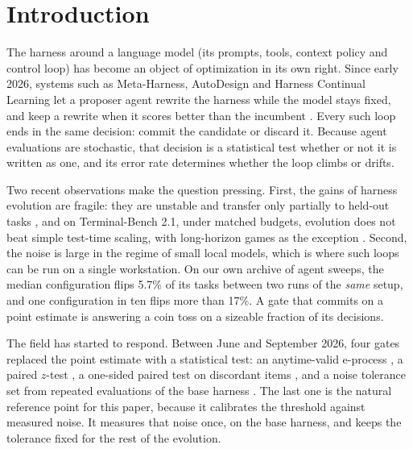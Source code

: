 
\section{Introduction}\label{sec:intro}

The harness around a language model (its prompts, tools, context policy and
control loop) has become an object of optimization in its own right. Since early
2026, systems such as Meta-Harness, AutoDesign and Harness Continual Learning
let a proposer agent rewrite the harness while the model stays fixed, and keep a
rewrite when it scores better than the incumbent
\citep{lee2026metaharness,luo2026autodesign,kang2026hcl}. Every such loop ends
in the same decision: commit the candidate or discard it. Because agent
evaluations are stochastic, that decision is a statistical test whether or not
it is written as one, and its error rate determines whether the loop climbs or
drifts.

Two recent observations make the question pressing. First, the gains of harness evolution are fragile: they are unstable and transfer only partially to held-out tasks \citep{wu2026harnessdev}, and on Terminal-Bench 2.1, under matched budgets, evolution does not beat simple test-time scaling, with long-horizon games as the exception \citep{wang2026rethinking}. Second, the noise is large in the regime of small local models, which is where such loops can be run on a single workstation. On our own archive of agent sweeps,
the median configuration flips 5.7\% of its tasks between two runs of the
\emph{same} setup, and one configuration in ten flips more than 17\%. A gate
that commits on a point estimate is answering a coin toss on a sizeable fraction
of its decisions.

The field has started to respond. Between June and September 2026, four gates
replaced the point estimate with a statistical test: an anytime-valid
e-process \citep{zayxshawn2026pace}, a paired $z$-test
\citep{luo2026harnessbank}, a one-sided paired test on discordant items
\citep{wang2026sage}, and a noise tolerance set from repeated evaluations of the
base harness \citep{xia2026rrsi}. The last one is the natural reference point
for this paper, because it calibrates the threshold against measured noise.
It measures that noise once, on the base harness, and keeps the tolerance fixed
for the rest of the evolution.

